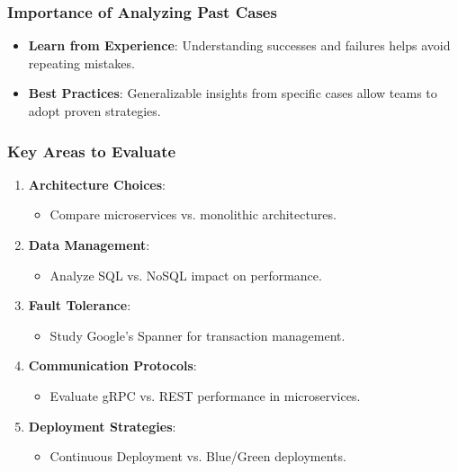 \documentclass[aspectratio=169]{beamer}
\begin{document}
\begin{frame}[fragile]
  \frametitle{Importance of Analyzing Past Cases}
  \begin{itemize}
    \item \textbf{Learn from Experience}: Understanding successes and failures helps avoid repeating mistakes.
    \item \textbf{Best Practices}: Generalizable insights from specific cases allow teams to adopt proven strategies.
  \end{itemize}
\end{frame}

\begin{frame}[fragile]
  \frametitle{Key Areas to Evaluate}
  \begin{enumerate}
    \item \textbf{Architecture Choices}:
      \begin{itemize}
        \item Compare microservices vs. monolithic architectures.
      \end{itemize}
    \item \textbf{Data Management}:
      \begin{itemize}
        \item Analyze SQL vs. NoSQL impact on performance.
      \end{itemize}
    \item \textbf{Fault Tolerance}:
      \begin{itemize}
        \item Study Google's Spanner for transaction management.
      \end{itemize}
    \item \textbf{Communication Protocols}:
      \begin{itemize}
        \item Evaluate gRPC vs. REST performance in microservices.
      \end{itemize}
    \item \textbf{Deployment Strategies}:
      \begin{itemize}
        \item Continuous Deployment vs. Blue/Green deployments.
      \end{itemize}
  \end{enumerate}
\end{frame}
\end{document}
